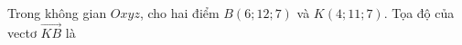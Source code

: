 \begin{ex}
Trong không gian $Oxyz$, cho hai điểm $B(6;12;7)$ và $K(4;11;7)$. Tọa độ của vectơ $\overrightarrow{KB}$ là
\end{ex}
